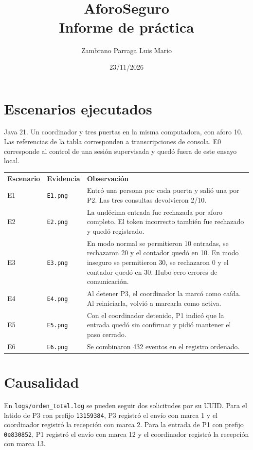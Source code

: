 \documentclass[11pt,a4paper]{article}
\title{AforoSeguro\\Informe de práctica}
\author{Zambrano Parraga Luis Mario}
\date{23/11/2026}
\begin{document}
\maketitle

\section{Escenarios ejecutados}
Java 21. Un coordinador y tres puertas en la misma computadora, con aforo 10.
Las referencias de la tabla corresponden a transcripciones de consola.
E0 corresponde al control de una sesión supervisada y quedó fuera de este ensayo local.

\small
\noindent
\begin{tabularx}{\textwidth}{@{} l l X @{}}
\textbf{Escenario} & \textbf{Evidencia} & \textbf{Observación} \\
E1 & \texttt{E1.png} & Entró una persona por cada puerta y salió una por P2. Las tres consultas devolvieron 2/10. \\
E2 & \texttt{E2.png} & La undécima entrada fue rechazada por aforo completo. El token incorrecto también fue rechazado y quedó registrado. \\
E3 & \texttt{E3.png} & En modo normal se permitieron 10 entradas, se rechazaron 20 y el contador quedó en 10. En modo inseguro se permitieron 30, se rechazaron 0 y el contador quedó en 30. Hubo cero errores de comunicación. \\
E4 & \texttt{E4.png} & Al detener P3, el coordinador la marcó como caída. Al reiniciarla, volvió a marcarla como activa. \\
E5 & \texttt{E5.png} & Con el coordinador detenido, P1 indicó que la entrada quedó sin confirmar y pidió mantener el paso cerrado. \\
E6 & \texttt{E6.png} & Se combinaron 432 eventos en el registro ordenado. \\
\end{tabularx}
\normalsize

\section{Causalidad}
En \texttt{logs/orden\_total.log} se pueden seguir dos solicitudes por su UUID.
Para el latido de P3 con prefijo \texttt{13159384}, P3 registró el envío
con marca 1 y el coordinador registró la recepción con marca 2.
Para la entrada de P1 con prefijo \texttt{0e830852}, P1 registró el envío
con marca 12 y el coordinador registró la recepción con marca 13.
\end{document}
